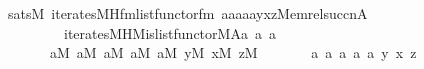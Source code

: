 \begin{isabellebody}
\ {\isachardoublequoteopen}sats{\isacharparenleft}{\kern0pt}M{\isacharcomma}{\kern0pt}\ iterates{\isacharunderscore}{\kern0pt}MH{\isacharunderscore}{\kern0pt}fm{\isacharparenleft}{\kern0pt}list{\isacharunderscore}{\kern0pt}functor{\isacharunderscore}{\kern0pt}fm{\isacharparenleft}{\kern0pt}{}{}{\isacharcomma}{\kern0pt}{}{\isacharcomma}{\kern0pt}{}{\isacharparenright}{\kern0pt}{\isacharcomma}{\kern0pt}{}{}{\isacharcomma}{\kern0pt}{}{\isacharcomma}{\kern0pt}{}{\isacharcomma}{\kern0pt}{}{\isacharparenright}{\kern0pt}{\isacharcomma}{\kern0pt}\ {\isacharbrackleft}{\kern0pt}a{}{\isacharcomma}{\kern0pt}a{}{\isacharcomma}{\kern0pt}a{}{\isacharcomma}{\kern0pt}a{}{\isacharcomma}{\kern0pt}a{}{\isacharcomma}{\kern0pt}y{\isacharcomma}{\kern0pt}x{\isacharcomma}{\kern0pt}z{\isacharcomma}{\kern0pt}Memrel{\isacharparenleft}{\kern0pt}succ{\isacharparenleft}{\kern0pt}n{\isacharparenright}{\kern0pt}{\isacharparenright}{\kern0pt}{\isacharcomma}{\kern0pt}A{\isacharcomma}{\kern0pt}{}{\isacharbrackright}{\kern0pt}{\isacharparenright}{\kern0pt}\isanewline
\ \ \ \ \ \ \ \ {\isasymlongleftrightarrow}\ iterates{\isacharunderscore}{\kern0pt}MH{\isacharparenleft}{\kern0pt}{\isacharhash}{\kern0pt}{\isacharhash}{\kern0pt}M{\isacharcomma}{\kern0pt}is{\isacharunderscore}{\kern0pt}list{\isacharunderscore}{\kern0pt}functor{\isacharparenleft}{\kern0pt}{\isacharhash}{\kern0pt}{\isacharhash}{\kern0pt}M{\isacharcomma}{\kern0pt}A{\isacharparenright}{\kern0pt}{\isacharcomma}{\kern0pt}{}{\isacharcomma}{\kern0pt}a{}{\isacharcomma}{\kern0pt}\ a{}{\isacharcomma}{\kern0pt}\ a{}{\isacharparenright}{\kern0pt}{\isachardoublequoteclose}\isanewline
\ \ \ \ \ \ \ {\isachardoublequoteopen}a{}{\isasymin}M{\isachardoublequoteclose}\ {\isachardoublequoteopen}a{}{\isasymin}M{\isachardoublequoteclose}\ {\isachardoublequoteopen}a{}{\isasymin}M{\isachardoublequoteclose}\ {\isachardoublequoteopen}a{}{\isasymin}M{\isachardoublequoteclose}\ {\isachardoublequoteopen}a{}{\isasymin}M{\isachardoublequoteclose}\ {\isachardoublequoteopen}y{\isasymin}M{\isachardoublequoteclose}\ {\isachardoublequoteopen}x{\isasymin}M{\isachardoublequoteclose}\ {\isachardoublequoteopen}z{\isasymin}M{\isachardoublequoteclose}\isanewline
\ \ \ \ \ \ \ a{}\ a{}\ a{}\ a{}\ a{}\ y\ x\ z\isanewline

\end{isabellebody}

